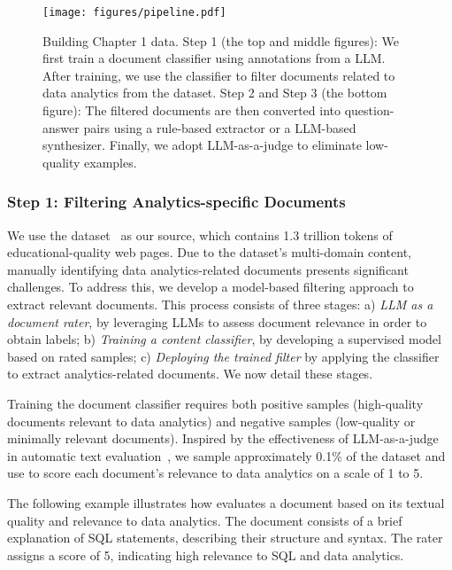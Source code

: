 \begin{figure}[tb]
 \centering
 \texttt{[image: figures/pipeline.pdf]}
 \caption{Building Chapter 1 data. Step 1 (the top
and middle figures): We first train a document classifier using annotations from a LLM. After training, we use the classifier to filter documents related to data analytics from the \fineweb dataset. Step 2 and Step 3 (the bottom figure): The filtered documents are then converted into question-answer pairs using a rule-based extractor or a LLM-based synthesizer. Finally, we adopt LLM-as-a-judge to eliminate low-quality examples.}
 \label{fig:chapt1-pipeline}
 \vspace{-2mm}
\end{figure} 

\subsubsection{Step 1: Filtering Analytics-specific Documents}
We use the \fineweb dataset~\citep{lozhkov2024fineweb-edu} as our source, which contains 1.3 trillion tokens of educational-quality web pages. Due to the dataset's multi-domain content, manually identifying data analytics-related documents presents significant challenges. To address this, we develop a model-based filtering approach to extract relevant documents. This process consists of three stages: a) \emph{LLM as a document rater}, by leveraging LLMs to assess document relevance in order to obtain labels; b) \emph{Training a content classifier}, by developing a supervised model based on rated samples; c) \emph{Deploying the trained filter} by applying the classifier to extract analytics-related documents. We now detail these stages.

Training the document classifier requires both positive samples (high-quality documents relevant to data analytics) and negative samples (low-quality or minimally relevant documents). 
Inspired by the effectiveness of LLM-as-a-judge in automatic text evaluation~\citep{gunasekar2023textbooks}, we sample approximately 0.1\% of the \fineweb dataset and use \claudetf to score each document’s relevance to data analytics on a scale of 1 to 5. 

The following example illustrates how \claudetf evaluates a document based on its textual quality and relevance to data analytics.
The document consists of a brief explanation of SQL statements, describing their structure and syntax. The rater assigns a score of 5, indicating high relevance to SQL and data analytics.

